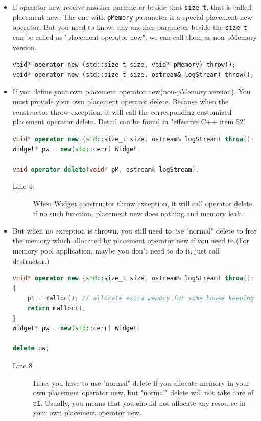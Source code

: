 \documentclass[a4paper,11pt,twoside]{book}
\begin{document}
\begin{itemize}
	
	\item If operator new receive another parameter beside that \texttt{size\_t}, that is called placement new. The one with \texttt{pMemory} parameter is a special placement new operator. But you need to know, any another parameter beside the \texttt{size\_t} can be called as "placement operator new", we can call them as non-pMemory version.
\begin{lstlisting}[]
void* operator new (std::size_t size, void* pMemory) throw();
void* operator new (std::size_t size, ostream& logStream) throw();
\end{lstlisting}
	
	\item If you define your own placement operator new(non-pMemory version). You must provide your own placement operator delete. Because when the constructor throw exception, it will call the corresponding customized placement operator delete. Detail can be found in "effective C++ item 52"
\begin{lstlisting}[frame=single, language=c++]
void* operator new (std::size_t size, ostream& logStream) throw();
Widget* pw = new(std::cerr) Widget
	
void operator delete(void* pM, ostream& logStream). 
\end{lstlisting}
\begin{description}
	\item[Line 4:] When Widget constructor throw exception, it will call operator delete. if no such function, placement new does nothing and memory leak.
\end{description}

		\item But when no exception is thrown,  you still need to use "normal" delete to free the memory which allocated by placement operator new if you need to.(For memory pool application, maybe you don't need to do it, just call destructor.)

\begin{lstlisting}[frame=single, language=c++]
void* operator new (std::size_t size, ostream& logStream) throw();
{
	p1 = malloc(); // allocate extra memory for some house keeping work.
	return malloc();
}
Widget* pw = new(std::cerr) Widget
	
delete pw;
\end{lstlisting}		
\begin{description}
	\item[Line 8] Here, you have to use "normal" delete if you allocate memory in your own placement operator new, but "normal" delete will not take care of \texttt{p1}. Usually, you means that you should not allocate any resource in your own placement operator new.
\end{description}


\end{itemize}
\end{document}
